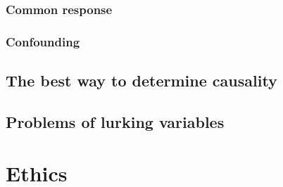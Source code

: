 \subsubsection{Common response}  %
\subsubsection{Confounding}  %
\subsection{The best way to determine causality}  %
\subsection{Problems of lurking variables}  %

\section{Ethics}  %
